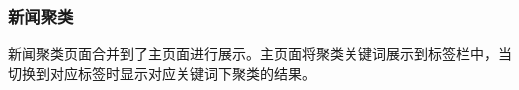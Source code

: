 \documentclass[UTF8]{article}
\begin{document}
\newpage
\subsubsection{新闻聚类}
新闻聚类页面合并到了主页面进行展示。主页面将聚类关键词展示到标签栏中，当切换到对应标签时显示对应关键词下聚类的结果。

\begin{figure}[htbp]
    \centering
\end{figure}
\end{document}
